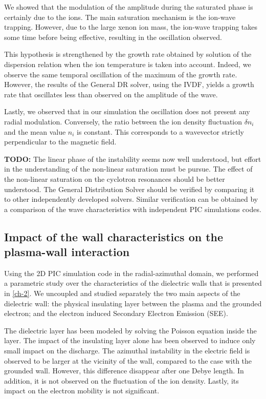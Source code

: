 We showed that the modulation of the amplitude during the saturated phase is certainly due to the ions.
The main saturation mechanism is the ion-wave trapping.
However, due to the large xenon ion mass, the ion-wave trapping takes some time before being effective, resulting in the oscillation observed.

This hypothesis is strengthened by the growth rate obtained by solution of the dispersion relation when the ion temperature is taken into account.
Indeed, we observe the same temporal oscillation of the maximum of the  growth rate.
However, the results of the General DR solver, using the IVDF, yields a growth rate that oscillates less than observed on the amplitude of the wave.

Lastly, we observed that in our simulation the oscillation does not present any radial modulation.
Conversely, the ratio between the ion density fluctuation $\delta n_i$ and the mean value $n_i$ is constant. 
This corresponds to a wavevector strictly perpendicular to the magnetic field.

{\bf TODO:} The linear phase of the instability seems now well understood, but effort in the understanding of the non-linear saturation must be pursue.
The effect of the non-linear saturation on the cyclotron resonances should be better understood.
The General Distribution Solver should be verified by comparing it to other independently developed solvers.
Similar verification can be obtained by a comparison of the wave characteristics with independent PIC simulations codes.

\subsection{Impact of the wall characteristics on the plasma-wall interaction }
Using the 2D PIC simulation code in the radial-azimuthal domain, we performed a parametric study over the characteristics of the dielectric walls that is presented in \cref{ch-2}.
We uncoupled and studied separately the two main aspects of the dielectric wall\string: the physical insulating layer between the plasma and the grounded electron; and the electron induced Secondary Electron Emission (SEE).

The dielectric layer has been modeled by solving the Poisson equation inside the layer.
The impact of the insulating layer alone has been observed to induce only small impact on the discharge.
The azimuthal instability in the electric field is observed to be larger at the vicinity of the wall, compared to the case with the grounded wall.
However, this difference disappear after one Debye length.
In addition, it is not observed on the fluctuation of the ion density.
Lastly, its impact on the electron mobility is not significant.

